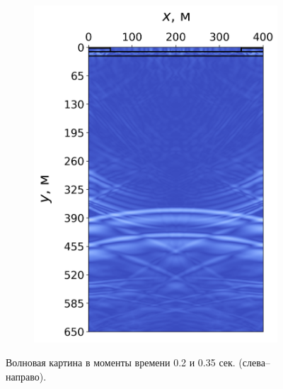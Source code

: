 \begin{figure}[H]
\begin{subfigure}{0.49\textwidth}
        \includegraphics[width=\textwidth]{images/gas_field/008000.png}
    \end{subfigure}
    \caption[Волновая картина в моменты времени 0.2 и 0.35 сек. (слева--направо).]{Волновая картина в моменты времени 0.2 и 0.35 сек. (слева--направо)\protect\footnotemark.}
    \label{fig:wave_image_2}
\end{figure}


